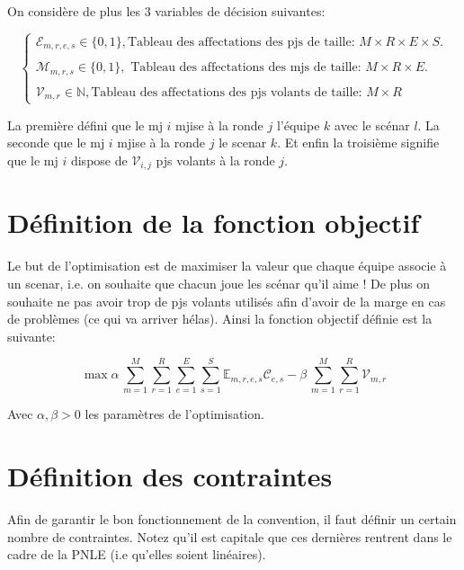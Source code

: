 \documentclass[11pt,a4paper]{article}
\begin{document}
On considère de plus les 3 variables de décision suivantes:

\begin{equation}
\begin{cases}
\mathcal{E}_{m,r,e,s} \in \{0,1\}, \text{Tableau des affectations des pjs de taille: } M \times R \times E \times S.
\\ \\
\mathcal{M}_{m,r,s} \in \{0,1\}, \text{ Tableau des affectations des mjs de taille: } M \times R \times E.
\\ \\
\mathcal{V}_{m,r} \in \mathbb{N}, \text{Tableau des affectations des pjs volants de taille: } M \times R

\end{cases}
\end{equation}

La première défini que le mj $i$ mjise à la ronde $j$ l'équipe $k$ avec le scénar $l$. La seconde que le mj $i$ mjise à la ronde $j$ le scenar $k$. Et enfin la troisième signifie que le mj $i$ dispose de $\mathcal{V}_{i,j}$ pjs volants à la ronde $j$.

\section{Définition de la fonction objectif}

Le but de l'optimisation est de maximiser la valeur que chaque équipe associe à un scenar, i.e. on souhaite que chacun joue les scénar qu'il aime ! De plus on souhaite ne pas avoir trop de pjs volants utilisés afin d'avoir de la marge en cas de problèmes (ce qui va arriver hélas).
Ainsi la fonction objectif définie est la suivante:

\begin{equation}\label{Obj-func}
	\max \alpha \,\sum_{m=1}^{M} \sum_{r=1}^{R} \sum_{e=1}^{E} \sum_{s=1}^{S} \mathbb{E}_{m,r,e,s} \mathcal{C}_{e,s} - \beta \,\sum_{m=1}^M \sum_{r=1}^R \mathcal{V}_{m,r}
\end{equation}

Avec $\alpha, \beta > 0$ les paramètres de l'optimisation.

\section{Définition des contraintes}

Afin de garantir le bon fonctionnement de la convention, il faut définir un certain nombre de contraintes. Notez qu'il est capitale que ces dernières rentrent dans le cadre de la PNLE (i.e qu'elles soient linéaires).
\end{document}

